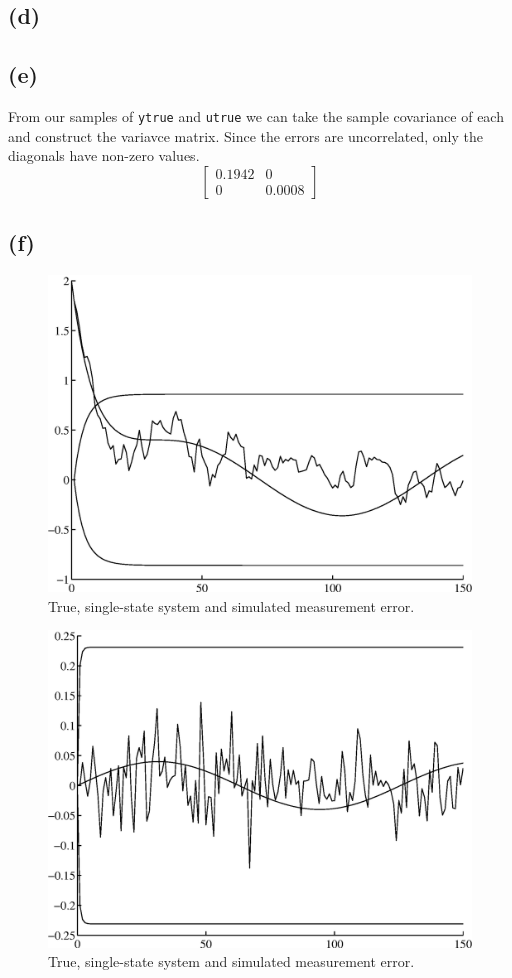 \documentclass[fleqn, letterpaper]{tufte-handout}
\begin{document}
\subsection{(d)}
\subsection{(e)}
From our samples of \texttt{ytrue} and \texttt{utrue} we can take the sample covariance of each and construct the variavce matrix. Since the errors are uncorrelated, only the diagonals have non-zero values.
\[
\begin{bmatrix} 0.1942 & 0 \\ 0 & 0.0008
\end{bmatrix}
\]
\subsection{(f)}
\begin{figure}
        \includegraphics[width=\textwidth]{2fa}
        \caption{True, single-state system and simulated measurement error.}
        \label{2fa}
\end{figure}
\begin{figure}
        \includegraphics[width=\textwidth]{2fb}
        \caption{True, single-state system and simulated measurement error.}
        \label{2fb}
\end{figure}
\end{document}
